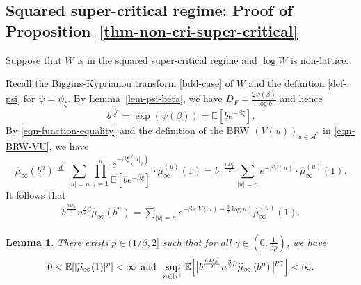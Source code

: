 \documentclass[12pt]{amsart}
\newtheorem{lemma}[theorem]{Lemma}
\theoremstyle{definition}
\theoremstyle{remark}
\newcommand{\N}{\mathbb{N}}
\newcommand{\E}{\mathbb{E}}
\newcommand{\Ab}{\mathcal{A}}
\newcommand{\an}{\text{\, and \,}}
\numberwithin{equation}{section}
\begin{document}
\subsection{Squared super-critical regime: Proof of Proposition~\ref{thm-non-cri-super-critical}}

Suppose that $W$ is in the squared super-critical regime and $\log W$ is non-lattice. 

Recall the Biggins-Kyprianou transform \eqref{bdd-case} of $W$ and   the definition \eqref{def-psi} for $\psi = \psi_\xi$.  By Lemma~\ref{lem-psi-beta}, we have 
$
 D_F = \frac{2 \psi(\beta)}{\log b}
$
and hence 
\[
b^{\frac{D_F}{2}}=\exp(\psi(\beta)) =  \E[be^{-\beta \xi}]. 
\]
 By \eqref{eqn-function-equality} and the definition of the BRW $(V(u))_{u\in \Ab^*}$ in  \eqref{eqn-BRW-VU}, we have 
\[
 \widehat{\mu}_{\infty}\left(b^n\right)\stackrel{d}{=}  \sum_{|u|=n}  \prod_{j=1}^{n} \frac{e^{-\beta \xi(u|_j)}}{\E[b e^{-\beta\xi}]}  \cdot \widehat{\mu}_{\infty}^{(u)}(1)  = b^{- \frac{nD_F}{2}}  \sum_{|u| = n } e^{- \beta V(u)} \cdot \widehat{\mu}_{\infty}^{(u)}(1). 
\]
It follows that 
\begin{align}\label{eqn-psi-t-star}
  b^{\frac{n D_F}{2}}   n^{\frac{3}{2}\beta} \widehat{\mu}_{\infty}\left(b^n\right) = \sum_{|u|=n} e^{-\beta ( V(u)-\frac{3}{2}\log n )}\widehat{\mu}_{\infty}^{(u)}(1).
\end{align}



 \begin{lemma}\label{lemma-tightness}
There exists  $p\in (1/\beta,2]$ such that  for all $\gamma \in (0, \frac{1}{\beta p})$, we have
\[
0< \E[|\widehat{\mu}_\infty(1)|^p]<\infty \an 
\sup_{n\in\N^+}\E\Big[\big| b^{\frac{n D_F}{2}}   n^{\frac{3}{2}\beta} \widehat{\mu}_{\infty}\left(b^n\right)  \big|^{p\gamma}\Big]<\infty. 
\]
\end{lemma}
\end{document}
